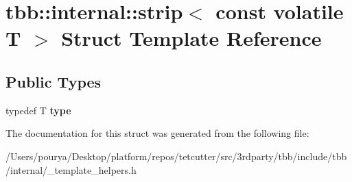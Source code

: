 \hypertarget{structtbb_1_1internal_1_1strip_3_01const_01volatile_01T_01_4}{}\section{tbb\+:\+:internal\+:\+:strip$<$ const volatile T $>$ Struct Template Reference}
\label{structtbb_1_1internal_1_1strip_3_01const_01volatile_01T_01_4}
\subsection*{Public Types}
\begin{DoxyCompactItemize}
\item 
\hypertarget{structtbb_1_1internal_1_1strip_3_01const_01volatile_01T_01_4_a1f332f66aa8810bd496fe8d9049eb273}{}typedef T {\bfseries type}\label{structtbb_1_1internal_1_1strip_3_01const_01volatile_01T_01_4_a1f332f66aa8810bd496fe8d9049eb273}

\end{DoxyCompactItemize}


The documentation for this struct was generated from the following file\+:\begin{DoxyCompactItemize}
\item 
/\+Users/pourya/\+Desktop/platform/repos/tetcutter/src/3rdparty/tbb/include/tbb/internal/\+\_\+template\+\_\+helpers.\+h\end{DoxyCompactItemize}
